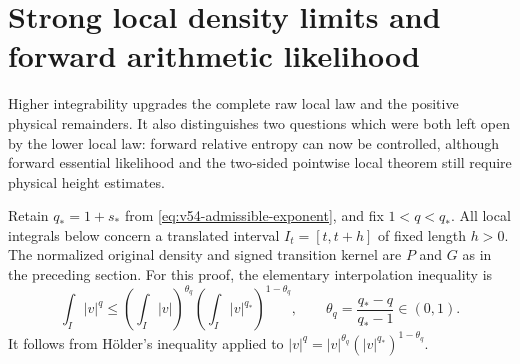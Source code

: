 \section{Strong local density limits and forward arithmetic likelihood}
\label{sec:v54-forward-likelihood}
Higher integrability upgrades the complete raw local law and the
positive physical remainders. It also distinguishes two questions
which were both left open by the lower local law: forward relative
entropy can now be controlled, although forward essential likelihood
and the two-sided pointwise local theorem still require physical
height estimates.

Retain $q_*=1+s_*$ from \eqref{eq:v54-admissible-exponent}, and fix
$1<q<q_*$. All local integrals below concern a translated interval
$I_t=[t,t+h]$ of fixed length $h>0$. The normalized original density
and signed transition kernel are $P$ and $G$ as in the preceding
section. For this proof, the elementary interpolation inequality is
\begin{equation}\label{eq:v54-local-interpolation}
 \int_I |v|^q
 \le\left(\int_I |v|\right)^{\theta_q}
       \left(\int_I |v|^{q_*}\right)^{1-\theta_q},
 \qquad \theta_q=\frac{q_*-q}{q_*-1}\in(0,1).
\end{equation}
It follows from H\"older's inequality applied to
$|v|^q=|v|^{\theta_q}(|v|^{q_*})^{1-\theta_q}$.

